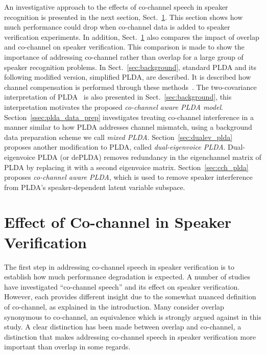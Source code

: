 An investigative approach to the effects of co-channel speech in speaker recognition is presented in the next section, Sect.~\ref{sec:cochannl_in_sid}. 
This section shows how much performance could drop when co-channel data is added to speaker verification experiments. 
In addition, Sect.~\ref{sec:cochannl_in_sid} also compares the impact of overlap and co-channel on speaker verification. 
This comparison is made to show the importance of addressing co-channel rather than overlap for a large group of speaker recognition problems. 
In Sect.~\ref{sec:background}, standard PLDA and its following modified version, simplified PLDA, are described. 
It is described how channel compensation is performed through these methods~\cite{prince_plda,kenny_plda}. 
The two-covariance interpretation of PLDA~\cite{ioffePLDA2006} is also presented in Sect.~\ref{sec:background}, this interpretation motivates the proposed {\it co-channel aware PLDA model}. 
Section~\ref{ssec:plda_data_prep} investigates treating co-channel interference in a manner similar to how PLDA addresses channel mismatch, using a background data preparation scheme we call {\it mixed PLDA}. 
Section~\ref{sec:dualev_plda} proposes another modification to PLDA, called {\it dual-eigenvoice PLDA}. Dual-eigenvoice PLDA (or dePLDA) removes redundancy in the eigenchannel matrix of PLDA by replacing it with a second eigenvoice matrix. 
Section~\ref{sec:cch_plda} proposes {\it co-channel aware PLDA}, which is used to remove speaker interference from PLDA's speaker-dependent latent variable subspace. 

\section{Effect of Co-channel in Speaker Verification}
\label{sec:cochannl_in_sid}

The first step in addressing co-channel speech in speaker verification is to establish how much performance degradation is expected. 
A number of studies have investigated ``co-channel speech'' and its effect on speaker verification. 
However, each provides different insight due to the somewhat nuanced definition of co-channel, as explained in the introduction. 
Many consider overlap synonymous to co-channel, an equivalence which is strongly argued against in this study. 
A clear distinction has been made between overlap and co-channel, a distinction that makes addressing co-channel speech in speaker verification more important than overlap in some regards. 

